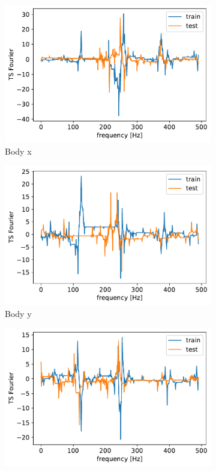 \documentclass[10pt, a4paper, twocolumn]{article}
\begin{document}
\begin{figure}
    \centering
    
    
    \begin{subfigure}[t]{0.15\textwidth}
    \includegraphics[width=\linewidth]{body_x_WALKING.pdf}
    \caption{Body x  }
    \label{fig:bxwal}
    \end{subfigure}
    \hfill%
    \begin{subfigure}[t]{0.15\textwidth}
    \includegraphics[width=\linewidth]{body_y_WALKING.pdf}
    \caption{Body y  }
    \label{fig:bywal}
    \end{subfigure}
    \hfill%
    \begin{subfigure}[t]{0.15\textwidth}
    \includegraphics[width=\linewidth]{body_z_WALKING.pdf}

\end{subfigure}
\end{figure}
\end{document}

